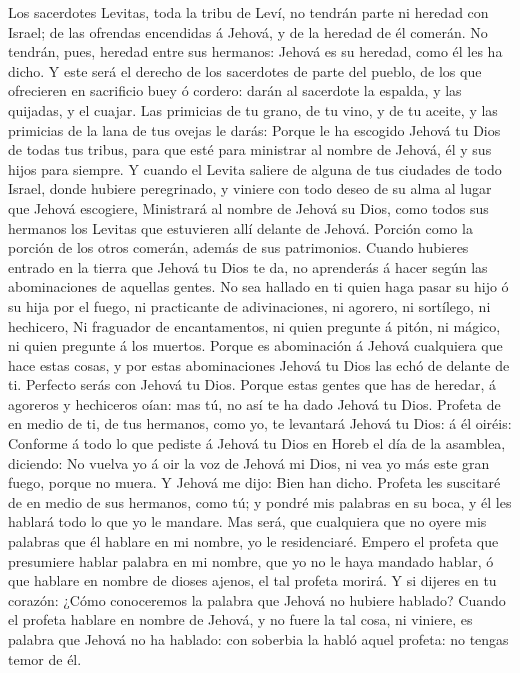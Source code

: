  Los sacerdotes Levitas, toda la tribu de Leví, no tendrán
parte ni heredad con Israel; de las ofrendas encendidas á Jehová, y de
la heredad de él comerán.  No tendrán, pues, heredad entre
sus hermanos: Jehová es su heredad, como él les ha dicho. 
Y este será el derecho de los sacerdotes de parte del pueblo, de los que
ofrecieren en sacrificio buey ó cordero: darán al sacerdote la espalda,
y las quijadas, y el cuajar.  Las primicias de tu grano,
de tu vino, y de tu aceite, y las primicias de la lana de tus ovejas le
darás:  Porque le ha escogido Jehová tu Dios de todas tus
tribus, para que esté para ministrar al nombre de Jehová, él y sus hijos
para siempre.  Y cuando el Levita saliere de alguna de tus
ciudades de todo Israel, donde hubiere peregrinado, y viniere con todo
deseo de su alma al lugar que Jehová escogiere, 
Ministrará al nombre de Jehová su Dios, como todos sus hermanos los
Levitas que estuvieren allí delante de Jehová.  Porción
como la porción de los otros comerán, además de sus patrimonios.
 Cuando hubieres entrado en la tierra que Jehová tu Dios
te da, no aprenderás á hacer según las abominaciones de aquellas gentes.
 No sea hallado en ti quien haga pasar su hijo ó su hija
por el fuego, ni practicante de adivinaciones, ni agorero, ni sortílego,
ni hechicero,  Ni fraguador de encantamentos, ni quien
pregunte á pitón, ni mágico, ni quien pregunte á los muertos.
 Porque es abominación á Jehová cualquiera que hace estas
cosas, y por estas abominaciones Jehová tu Dios las echó de delante de
ti.  Perfecto serás con Jehová tu Dios. 
Porque estas gentes que has de heredar, á agoreros y hechiceros oían:
mas tú, no así te ha dado Jehová tu Dios.  Profeta de en
medio de ti, de tus hermanos, como yo, te levantará Jehová tu Dios: á él
oiréis:  Conforme á todo lo que pediste á Jehová tu Dios
en Horeb el día de la asamblea, diciendo: No vuelva yo á oir la voz de
Jehová mi Dios, ni vea yo más este gran fuego, porque no muera.
 Y Jehová me dijo: Bien han dicho. 
Profeta les suscitaré de en medio de sus hermanos, como tú; y pondré mis
palabras en su boca, y él les hablará todo lo que yo le mandare.
 Mas será, que cualquiera que no oyere mis palabras que
él hablare en mi nombre, yo le residenciaré.  Empero el
profeta que presumiere hablar palabra en mi nombre, que yo no le haya
mandado hablar, ó que hablare en nombre de dioses ajenos, el tal profeta
morirá.  Y si dijeres en tu corazón: ¿Cómo conoceremos la
palabra que Jehová no hubiere hablado?  Cuando el profeta
hablare en nombre de Jehová, y no fuere la tal cosa, ni viniere, es
palabra que Jehová no ha hablado: con soberbia la habló aquel profeta:
no tengas temor de él.

